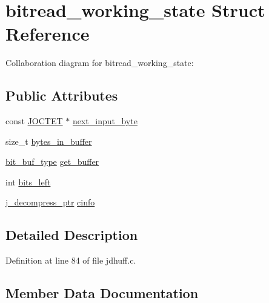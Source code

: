 \hypertarget{structbitread__working__state}{}\section{bitread\+\_\+working\+\_\+state Struct Reference}
\label{structbitread__working__state}


Collaboration diagram for bitread\+\_\+working\+\_\+state\+:
\subsection*{Public Attributes}
\begin{DoxyCompactItemize}
\item 
const \mbox{\hyperlink{jmorecfg_8h_a356ad249f20e691b520da439f92cccbc}{J\+O\+C\+T\+ET}} $\ast$ \mbox{\hyperlink{structbitread__working__state_a663f17ba1c850439118605f1842b2fbf}{next\+\_\+input\+\_\+byte}}
\item 
size\+\_\+t \mbox{\hyperlink{structbitread__working__state_a9564d55e83f5b154a50a84ffb4e45809}{bytes\+\_\+in\+\_\+buffer}}
\item 
\mbox{\hyperlink{jdhuff_8c_ab2d47e546a8ed21c68e22f54535574a8}{bit\+\_\+buf\+\_\+type}} \mbox{\hyperlink{structbitread__working__state_a1b14cadab00deca48688b336c6a48664}{get\+\_\+buffer}}
\item 
int \mbox{\hyperlink{structbitread__working__state_a3744bcf2fb8bc73560ea6e4d083cf6ff}{bits\+\_\+left}}
\item 
\mbox{\hyperlink{jpeglib_8h_a00c7d78af44bd26a901c791ccfc1e178}{j\+\_\+decompress\+\_\+ptr}} \mbox{\hyperlink{structbitread__working__state_ae6ed0f717c279eac7ac54cec32cfaa3e}{cinfo}}
\end{DoxyCompactItemize}


\subsection{Detailed Description}


Definition at line 84 of file jdhuff.\+c.



\subsection{Member Data Documentation}
\mbox{\label{structbitread__working__state_a3744bcf2fb8bc73560ea6e4d083cf6ff}} 
